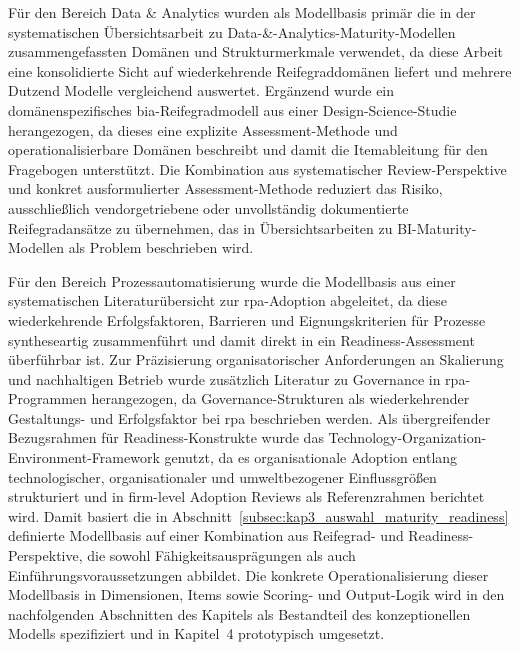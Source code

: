 Für den Bereich Data \& Analytics wurden als Modellbasis primär die in der systematischen Übersichtsarbeit zu Data-\&-Analytics-Maturity-Modellen zusammengefassten Domänen und Strukturmerkmale verwendet, da diese Arbeit eine konsolidierte Sicht auf wiederkehrende Reifegraddomänen liefert und mehrere Dutzend Modelle vergleichend auswertet.\cite{Langer2025DataAnalyticsMaturityReview}
Ergänzend wurde ein domänenspezifisches \gls{bia}-Reifegradmodell aus einer Design-Science-Studie herangezogen, da dieses eine explizite Assessment-Methode und operationalisierbare Domänen beschreibt und damit die Itemableitung für den Fragebogen unterstützt.\cite{CardosoSu2022BIAMaturityModel,BeckerKnackstedtPoeppelbuss2009ProcedureModel}
Die Kombination aus systematischer Review-Perspektive und konkret ausformulierter Assessment-Methode reduziert das Risiko, ausschließlich vendorgetriebene oder unvollständig dokumentierte Reifegradansätze zu übernehmen, das in Übersichtsarbeiten zu BI-Maturity-Modellen als Problem beschrieben wird.\cite{ChuahWong2011BIMaturityReview,Langer2025DataAnalyticsMaturityReview}

Für den Bereich Prozessautomatisierung wurde die Modellbasis aus einer systematischen Literaturübersicht zur \gls{rpa}-Adoption abgeleitet, da diese wiederkehrende Erfolgsfaktoren, Barrieren und Eignungskriterien für Prozesse syntheseartig zusammenführt und damit direkt in ein Readiness-Assessment überführbar ist.\cite{daSilvaCostaMamedeSilva2022RPAAdoptionSLR,KitchenhamCharters2007SLRGuidelines}
Zur Präzisierung organisatorischer Anforderungen an Skalierung und nachhaltigen Betrieb wurde zusätzlich Literatur zu Governance in \gls{rpa}-Programmen herangezogen, da Governance-Strukturen als wiederkehrender Gestaltungs- und Erfolgsfaktor bei \gls{rpa} beschrieben werden.\cite{KedzioraPenttinen2021RPAGovernance,daSilvaCostaMamedeSilva2022RPAAdoptionSLR}
Als übergreifender Bezugsrahmen für Readiness-Konstrukte wurde das Technology-Organization-Environment-Framework genutzt, da es organisationale Adoption entlang technologischer, organisationaler und umweltbezogener Einflussgrößen strukturiert und in firm-level Adoption Reviews als Referenzrahmen berichtet wird.\cite{TornatzkyFleischer1990TOE,OliveiraMartins2011ITAdoptionReview}
Damit basiert die in Abschnitt~\ref{subsec:kap3_auswahl_maturity_readiness} definierte Modellbasis auf einer Kombination aus Reifegrad- und Readiness-Perspektive, die sowohl Fähigkeitsausprägungen als auch Einführungsvoraussetzungen abbildet.\cite{PoeppeelbussRoeglinger2011DesignPrinciples,TornatzkyFleischer1990TOE,Langer2025DataAnalyticsMaturityReview}
Die konkrete Operationalisierung dieser Modellbasis in Dimensionen, Items sowie Scoring- und Output-Logik wird in den nachfolgenden Abschnitten des Kapitels als Bestandteil des konzeptionellen Modells spezifiziert und in Kapitel~4 prototypisch umgesetzt.\cite{deBruin2005MainPhases,BeckerKnackstedtPoeppelbuss2009ProcedureModel}


